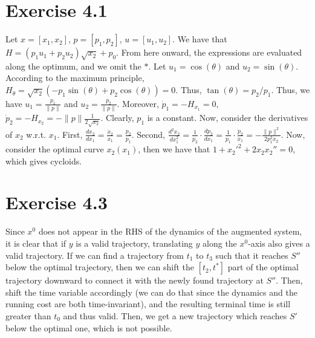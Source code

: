 \documentclass[11pt]{report}
\begin{document}

\section*{Exercise 4.1}
Let $x=[x_1, x_2]$, $p=[p_1, p_2]$, $u = [u_1, u_2]$. We have that $H = (p_1 u_1 + p_2 u_2)\sqrt{x_2} + p_0$. From here onward, the expressions are evaluated along the optimum, and we omit the $*$. Let $u_1 = \cos(\theta)$ and $u_2 = \sin(\theta)$. According to the maximum principle, $H_{\theta} = \sqrt{x_2}(-p_1 \sin(\theta)+p_2\cos(\theta)) = 0$. Thus, $\tan(\theta) = p_2/p_1$. Thus, we have $u_1 = \frac{p_1}{\|p\|}$ and $u_2 = \frac{p_2}{\|p\|}$. Moreover, $\dot{p}_1 = -H_{x_1} = 0$, $\dot{p}_2 = -H_{x_2} = -\|p\| \frac{1}{2\sqrt{x_2}}$. Clearly, $p_1$ is a constant. Now, consider the derivatives of $x_2$ w.r.t. $x_1$. First, $\frac{dx_2}{dx_1} = \frac{\dot{x}_2}{\dot{x}_1} = \frac{p_2}{p_1}$. Second, $\frac{d^2 x_2}{dx_1^2} = \frac{1}{p_2} \cdot \frac{dp_2}{dx_1} = \frac{1}{p_1} \cdot \frac{\dot{p}_2}{\dot{x}_1} = -\frac{\|p\|^2}{2p_1^2 x_2}$. Now, consider the optimal curve $x_2(x_1)$, then we have that $1+x_2'^2+2x_2x_2''=0$, which gives cycloids.



\section*{Exercise 4.3}
Since $x^0$ does not appear in the RHS of the dynamics of the augmented system, it is clear that if $y$ is a valid trajectory, translating $y$ along the $x^0$-axis also gives a valid trajectory. If we can find a trajectory from $t_1$ to $t_3$ such that it reaches $S''$ below the optimal trajectory, then we can shift the $[t_2, t^*]$ part of the optimal trajectory downward to connect it with the newly found trajectory at $S''$. Then, shift the time variable accordingly (we can do that since the dynamics and the running cost are both time-invariant), and the resulting terminal time is still greater than $t_0$ and thus valid. Then, we get a new trajectory which reaches $S'$ below the optimal one, which is not possible.
\end{document}
